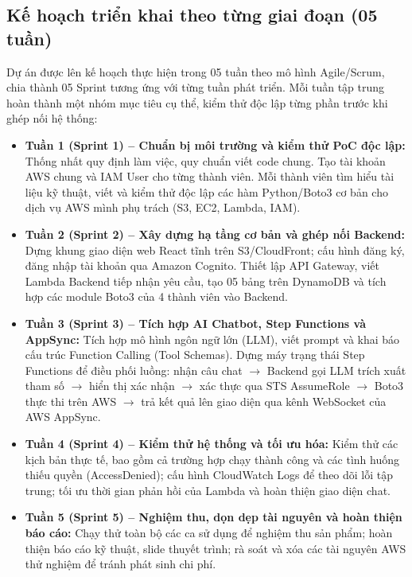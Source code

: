 \documentclass[a4paper,12pt]{article}
\begin{document}
\subsection{Kế hoạch triển khai theo từng giai đoạn (05 tuần)}

Dự án được lên kế hoạch thực hiện trong 05 tuần theo mô hình Agile/Scrum, chia thành 05 Sprint tương ứng với từng tuần phát triển. Mỗi tuần tập trung hoàn thành một nhóm mục tiêu cụ thể, kiểm thử độc lập từng phần trước khi ghép nối hệ thống:

\begin{itemize}
  \item \textbf{Tuần 1 (Sprint 1) -- Chuẩn bị môi trường và kiểm thử PoC độc lập:} Thống nhất quy định làm việc, quy chuẩn viết code chung. Tạo tài khoản AWS chung và IAM User cho từng thành viên. Mỗi thành viên tìm hiểu tài liệu kỹ thuật, viết và kiểm thử độc lập các hàm Python/Boto3 cơ bản cho dịch vụ AWS mình phụ trách (S3, EC2, Lambda, IAM).
  \item \textbf{Tuần 2 (Sprint 2) -- Xây dựng hạ tầng cơ bản và ghép nối Backend:} Dựng khung giao diện web React tĩnh trên S3/CloudFront; cấu hình đăng ký, đăng nhập tài khoản qua Amazon Cognito. Thiết lập API Gateway, viết Lambda Backend tiếp nhận yêu cầu, tạo 05 bảng trên DynamoDB và tích hợp các module Boto3 của 4 thành viên vào Backend.
  \item \textbf{Tuần 3 (Sprint 3) -- Tích hợp AI Chatbot, Step Functions và AppSync:} Tích hợp mô hình ngôn ngữ lớn (LLM), viết prompt và khai báo cấu trúc Function Calling (Tool Schemas). Dựng máy trạng thái Step Functions để điều phối luồng: nhận câu chat $\rightarrow$ Backend gọi LLM trích xuất tham số $\rightarrow$ hiển thị xác nhận $\rightarrow$ xác thực qua STS AssumeRole $\rightarrow$ Boto3 thực thi trên AWS $\rightarrow$ trả kết quả lên giao diện qua kênh WebSocket của AWS AppSync.
  \item \textbf{Tuần 4 (Sprint 4) -- Kiểm thử hệ thống và tối ưu hóa:} Kiểm thử các kịch bản thực tế, bao gồm cả trường hợp chạy thành công và các tình huống thiếu quyền (AccessDenied); cấu hình CloudWatch Logs để theo dõi lỗi tập trung; tối ưu thời gian phản hồi của Lambda và hoàn thiện giao diện chat.
  \item \textbf{Tuần 5 (Sprint 5) -- Nghiệm thu, dọn dẹp tài nguyên và hoàn thiện báo cáo:} Chạy thử toàn bộ các ca sử dụng để nghiệm thu sản phẩm; hoàn thiện báo cáo kỹ thuật, slide thuyết trình; rà soát và xóa các tài nguyên AWS thử nghiệm để tránh phát sinh chi phí.
\end{itemize}
\end{document}
